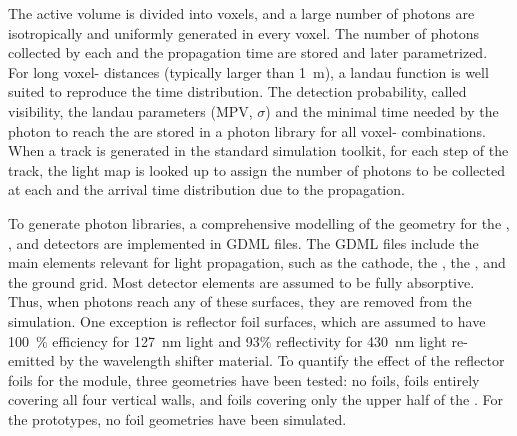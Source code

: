 The active volume is divided into voxels, and a large number of photons are isotropically and uniformly generated in every voxel. The number of photons collected by each  and the propagation time are stored and later parametrized. For long voxel- distances (typically larger than \SI{1}{\m}), a landau function is well suited to reproduce the time distribution. The detection probability, called visibility, the landau parameters (MPV, $\sigma$) and the minimal time needed by the photon to reach the  are stored in a photon library for all voxel- combinations. When a track is generated in the standard \dual {} simulation toolkit, for each step of the track, the light map is looked up to assign the number of photons to be collected at each  and the arrival time distribution due to the propagation. 

To generate photon libraries, a comprehensive modelling of the geometry for the , , and   detectors are implemented in GDML  files. The GDML files include the main elements relevant for light propagation, such as the cathode, the , the , and the ground grid. Most detector elements are assumed to be fully absorptive. Thus, when photons reach any of these surfaces, they are removed from the simulation. One exception is  reflector foil surfaces, which are assumed to have \SI{100}{\%}  efficiency for \SI{127}{\nm}  light and 93\% reflectivity for \SI{430}{\nm} light re-emitted by the wavelength shifter material. To quantify the effect of the  reflector foils for the   module, three geometries have been tested: no foils, foils entirely covering all four  vertical walls, and foils covering only the upper half of the . For the  prototypes, no foil geometries have been simulated.


